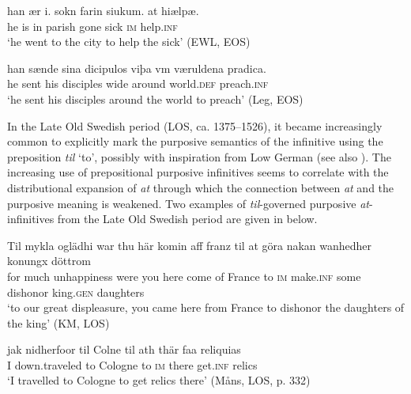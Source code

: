 \documentclass[output=paper]{langscibook}
\begin{document}
\ea
\label{ex:kalm:9}
\ea \label{ex:kalm:9a}
\gll han ær i. sokn farin siukum. at hiælpæ.\\
 he is in parish gone sick \textsc{im} help.\textsc{inf}\\ 
\glt ‘he went to the city to help the sick’ (EWL, EOS)

\ex \label{ex:kalm:9b}
\gll han sænde sina dicipulos viþa vm væruldena pradica.\\ 
 he sent his disciples wide around world.\textsc{def} preach.\textsc{inf}\\
\glt ‘he sent his disciples around the world to preach’ (Leg, EOS)
\z 
\z 

In the Late Old Swedish period (LOS, ca. 1375–1526), it became increasingly common to explicitly mark the purposive semantics of the infinitive using the preposition \textit{til} ‘to’, possibly with inspiration from Low German (see also ). The increasing use of prepositional purposive infinitives seems to correlate with the distributional expansion of \textit{at} through which the connection between \textit{at} and the purposive meaning is weakened. Two examples of \textit{til}{}-governed purposive \textit{at}{}-infinitives from the Late Old Swedish period are given in  below. 

\ea
\label{ex:kalm:10}
\ea  \label{ex:kalm:10a}
\gll Til mykla oglädhi war thu här komin aff franz til at göra nakan wanhedher konungx döttrom\\
for much unhappiness were you here come of France to \textsc{im} make.\textsc{inf} some dishonor king.\textsc{gen} daughters\\
\glt ‘to our great displeasure, you came here from France to dishonor the daughters of the king’ (KM, LOS)

\ex\label{ex:kalm:10b}
\gll jak nidherfoor til Colne til ath thär faa reliquias\\
 I down.traveled to Cologne to \textsc{im} there get.\textsc{inf} relics\\
\glt ‘I travelled to Cologne to get relics there’ (Måns, LOS, p. 332)
\z 
\z 
\end{document}
